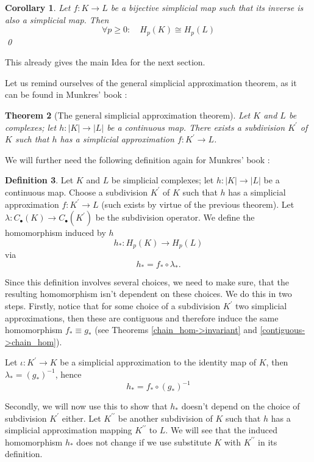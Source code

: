 \documentclass[toc=bib, headinclude]{scrartcl}
\theoremstyle{plain}
\newtheorem{theorem}{Theorem}[section]
\newtheorem{corollary}[theorem]{Corollary}
\theoremstyle{definition}
\newtheorem	{definition}[theorem]{Definition}
\theoremstyle{remark}
\newcommand{\pprime}{{\prime\prime}}
\newcommand{\isom}{\cong}
\begin{document}
\begin{corollary}\label{baby-case}
	Let $f: K\to L$ be a bijective simplicial map such that its inverse is also a simplicial map. Then \[
	\forall p\geq 0:\quad H_p(K)\isom H_p(L)
	\]\qed
\end{corollary}

This already gives the main Idea for the next section.

Let us remind ourselves of the general simplicial approximation theorem, as it can be found in Munkres' book \cite[Thm. 16.5, p. 85]{mu}:

\begin{theorem}[The general simplicial approximation theorem]
	Let $K$ and $L$ be complexes; let $h: |K|\to |L|$ be a continuous map. There exists a subdivision $K^\prime$ of $K$ such that $h$ has a simplicial approximation $f:K^\prime \to L$.
\end{theorem}

We will further need the following definition again for Munkres' book \cite[p. 100]{mu}:
\begin{definition}
	Let $K$ and $L$ be simplicial complexes; let $h:|K|\to |L|$ be a continuous map. Choose a subdivision $K^\prime$ of $K$ such that $h$ has a simplicial approximation $f:K^\prime\to L$ (such exists by virtue of the previous theorem). Let $\lambda:C_\bullet(K)\to C_\bullet(K^\prime)$ be the subdivision operator. We define the homomorphism induced by $h$ 
	\[
	h_\ast: H_p(K)\to H_p(L)
	\]
	via
	\[
	h_\ast=f_\ast\circ \lambda_\ast.
	\]
\end{definition}


Since this definition involves several choices, we need to make sure, that the resulting homomorphism isn't dependent on these choices. We do this in two steps. Firstly, notice that for some choice of a subdivision $K^\prime$ two simplicial approximations, then these are contiguous and therefore induce the same homomorphism $f_\ast\equiv g_\ast$ (see Theorems \ref{chain_hom->invariant} and \ref{contiguous->chain_hom}).

Let $\iota: K^\prime\to K $ be a simplicial approximation to the identity map of $K$, then $\lambda_\ast=(g_\ast)^{-1}$, hence
\[
h_\ast=f_\ast\circ(g_\ast)^{-1}
\]

Secondly, we will now use this to show that $h_\ast$ doesn't depend on the choice of subdivision $K^\prime$ either. Let $K^\pprime$ be another subdivision of $K$ such that $h$ has a simplicial approximation mapping $K^\pprime$ to $L$. We will see that the induced homomorphism $h_\ast$ does not change if we use substitute $K$ with $K^\pprime$ in its definition.
\end{document}
